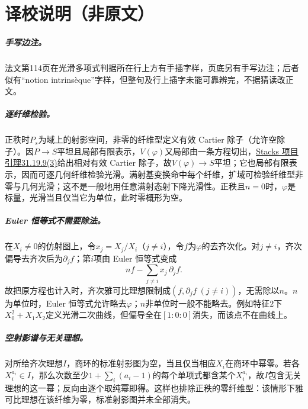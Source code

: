 \documentclass[openany,fontset=fandol]{ctexbook}
\begin{document}
\chapter*{译校说明（非原文）}
\enlargethispage{3\baselineskip}
\paragraph{手写边注。}
法文第114页在光滑多项式判据所在行上方有手插字样，页底另有手写边注；后者似有“notion intrinsèque”字样，但整句及行上插字未能可靠辨完，不据猜读改正文。

\paragraph{逐纤维检验。}
正秩时$P_s$为域上的射影空间，非零的纤维型定义有效 Cartier 除子（允许空除子）。因$P\to S$平坦且局部有限表示，$V(\varphi)$又局部由一条方程切出，\href{https://stacks.math.columbia.edu/tag/062Y}{Stacks 项目引理31.19.9(3)}给出相对有效 Cartier 除子，故$V(\varphi)\to S$平坦；它也局部有限表示，因而可逐几何纤维检验光滑。满射基变换命中每个纤维，扩域可检验纤维型非零与几何光滑；这不是一般地用任意满射态射下降光滑性。正秩且$n=0$时，$\varphi$是标量，光滑当且仅当它为单位，此时零概形为空。

\paragraph{Euler 恒等式不需要除法。}
在$X_i\ne0$的仿射图上，令$x_j=X_j/X_i$（$j\ne i$），令$f$为$\varphi$的去齐次化。对$j\ne i$，齐次偏导去齐次后为$\partial_j f$；第$i$项由 Euler 恒等式变成
\[
n f-\sum_{j\ne i}x_j\,\partial_j f.
\]
故把原方程也计入时，齐次雅可比理想限制成$(f,\partial_j f\ (j\ne i))$，无需除以$n$。$n$为单位时，Euler 恒等式允许略去$\varphi$；$n$非单位时一般不能略去。例如特征$2$下$X_0^2+X_1X_2$定义光滑二次曲线，但偏导全在$[1:0:0]$消失，而该点不在曲线上。

\paragraph{空射影谱与无关理想。}
对所给齐次理想$I$，商环的标准射影图为空，当且仅当相应$X_i$在商环中幂零。若各$X_i^{a_i}\in I$，那么次数至少$1+\sum_i(a_i-1)$的每个单项式都含某个$X_i^{a_i}$，故$I$包含无关理想的这一幂；反向由逐个取纯幂即得。这样也排除正秩的零纤维型：该情形下雅可比理想在该纤维为零，标准射影图并未全部消失。
\end{document}
